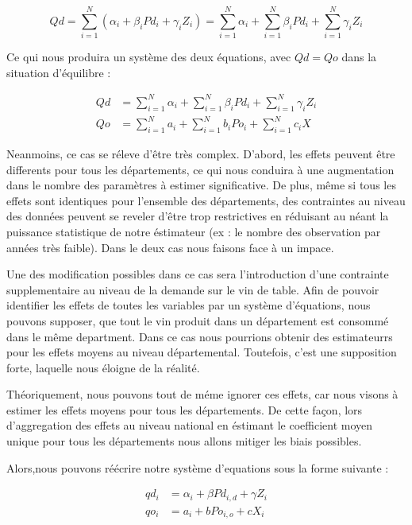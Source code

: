 \documentclass[11pt,]{article}
\begin{document}
\begin{equation*}
    Qd = \sum_{i = 1}^{N} ( \alpha_i + \beta_i Pd_i + \gamma_i Z_i ) = \sum_{i = 1}^{N} \alpha_i + \sum_{i = 1}^{N} \beta_i Pd_i + \sum_{i = 1}^{N} \gamma_i Z_i
\end{equation*}

Ce qui nous produira un système des deux équations, avec \(Qd = Qo\)
dans la situation d'équilibre :

\begin{align*}
    Qd & = \sum_{i = 1}^{N} \alpha_i + \sum_{i = 1}^{N} \beta_i Pd_i + \sum_{i = 1}^{N} \gamma_i Z_i \\
    Qo & = \sum_{i = 1}^{N} a_i + \sum_{i = 1}^{N} b_i Po_i + \sum_{i = 1}^{N} c_i X
\end{align*}

Neanmoins, ce cas se réleve d'être très complex. D'abord, les effets
peuvent être differents pour tous les départements, ce qui nous conduira
à une augmentation dans le nombre des paramètres à estimer
significative. De plus, même si tous les effets sont identiques pour
l'ensemble des départements, des contraintes au niveau des données
peuvent se reveler d'être trop restrictives en réduisant au néant la
puissance statistique de notre éstimateur (ex : le nombre des
observation par années très faible). Dans le deux cas nous faisons face
à un impace.

Une des modification possibles dans ce cas sera l'introduction d'une
contrainte supplementaire au niveau de la demande sur le vin de table.
Afin de pouvoir identifier les effets de toutes les variables par un
système d'équations, nous pouvons supposer, que tout le vin produit dans
un département est consommé dans le même department. Dans ce cas nous
pourrions obtenir des estimateurrs pour les effets moyens au niveau
départemental. Toutefois, c'est une supposition forte, laquelle nous
éloigne de la réalité.

Théoriquement, nous pouvons tout de méme ignorer ces effets, car nous
visons à estimer les effets moyens pour tous les départements. De cette
façon, lors d'aggregation des effets au niveau national en éstimant le
coefficient moyen unique pour tous les départements nous allons mitiger
les biais possibles.

Alors,nous pouvons réécrire notre système d'equations sous la forme
suivante :

\begin{align*}
  qd_i & = \alpha_{i} + \beta Pd_{i,d} + \gamma Z_{i} \\
  qo_i & = a_i + b Po_{i,o} + c X_{i} \\ 
\end{align*}
\end{document}
